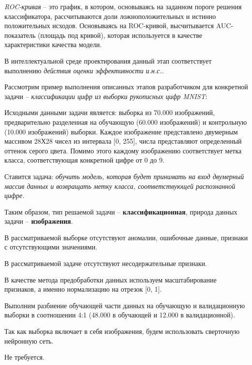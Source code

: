\textit{ROC-кривая} -- это график, в котором, основываясь на заданном пороге решения классификатора, рассчитываются доли ложноположительных и истинно положительных исходов. Основываясь на ROC-кривой, высчитывается AUC-показатель (площадь под кривой), которая используется в качестве характеристики качества модели.

В интеллектуальной среде проектирования данный этап соответствует выполнению \textit{действия оценки эффективности и.н.с.}.

Рассмотрим пример выполнения описанных этапов разработчиком для конкретной задачи -- \textit{классификации цифр из выборки рукописных цифр MNIST}:

\begin{textitemize}
\item Исходными данными задачи является: выборка из 70.000 изображений, предварительно разделенная на обучающую (60.000 изображений) и контрольную (10.000 изображений) выборки. Каждое изображение представлено двумерным массивом 28Х28 чисел из интервала [0, 255], числа представляют определенный оттенок серого цвета. Помимо этого каждому изображению соответствует метка класса, соответствующая конкретной цифре от 0 до 9.

Ставится задача: \textit{обучить модель, которая будет принимать на вход двумерный массив данных и возвращать метку класса, соответствующей распознанной цифре.}

Таким образом, тип решаемой задачи -- \textbf{классификационная}, природа данных задачи -- \textbf{изображения}.


\item В рассматриваемой выборке отсутствуют аномалии, ошибочные данные, признаки с отсутствующими значениями.


\item В рассматриваемой задаче отсутствуют несодержательные признаки.


\item В качестве метода предобработки данных используем масштабирование признаков, а именно нормализацию на отрезок [0, 1].


\item Выполним разбиение обучающей части данных на обучающую и валидационную выборки в соотношении 4:1 (48.000 в обучающей и 12.000 в валидационной).


\item Так как выборка включает в себя изображения, будем использовать сверточную нейронную сеть.


\item Не требуется.



\end{textitemize}
